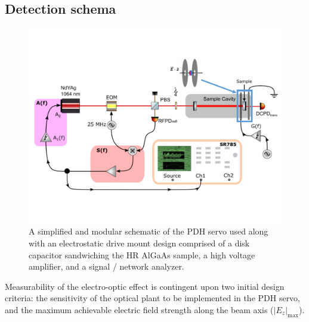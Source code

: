 \subsection{Detection schema}
\begin{figure}[H]
\includegraphics[width=\textwidth]{figs/ALGAAS/algaas_pockels_effect_measurement_schematic.pdf}
\caption{A simplified and modular schematic of the PDH servo used along with an electrostatic drive mount design comprised of a disk capacitor sandwiching the HR AlGaAs sample, a high voltage amplifier, and a signal / network analyzer.}
\label{fig:simplified_experiment_schema}
\end{figure}
 Measurability of the electro-optic effect is contingent upon two initial design criteria: the sensitivity of the optical plant to be implemented in the PDH servo, and the maximum achievable electric field strength along the beam axis ($|E_z|_\mathrm{max}$).

